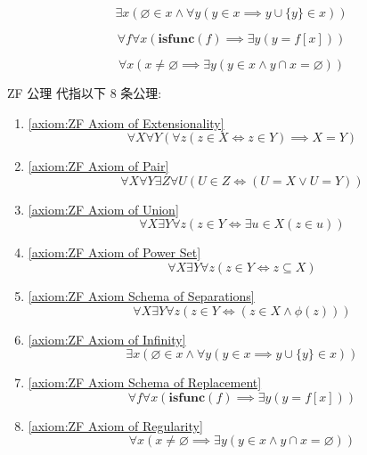 \begin{axiom}
    \label {axiom:ZF Axiom of Infinity}
    \[
        \exists x (\varnothing \in x \land \forall y (y \in x \implies y \cup \{y\} \in x))
    \]
\end{axiom}

\begin{axiom}
    \label {axiom:ZF Axiom Schema of Replacement}
    \[
        \forall f \forall x (\mathbf{isfunc} (f) \implies \exists y (y = f[x]))
    \]
\end{axiom}

\begin{axiom}
    \label {axiom:ZF Axiom of Regularity}
    \[
        \forall x (x \neq \varnothing \implies \exists y (y \in x \land y \cap x = \varnothing))
    \]
\end{axiom}

ZF 公理 \cite{ThomasJech:SetTheory} 代指以下 8 条公理:

\begin{enumerate}
    \item \ref{axiom:ZF Axiom of Extensionality}
    \[
        \forall X \forall Y (\forall z (z \in X \iff z \in Y) \implies X = Y)
    \]
    \item \ref{axiom:ZF Axiom of Pair}
    \[
        \forall X \forall Y \exists Z \forall U (U \in Z \iff (U = X \lor U = Y))
    \]
    \item \ref{axiom:ZF Axiom of Union}
    \[
        \forall X \exists Y \forall z (z \in Y \iff \exists u \in X (z \in u))
    \]
    \item \ref{axiom:ZF Axiom of Power Set}
    \[
        \forall X \exists Y \forall z (z \in Y \iff z \subseteq X)
    \]
    \item \ref{axiom:ZF Axiom Schema of Separations}
    \[
        \forall X \exists Y \forall z (z \in Y \iff (z \in X \land \phi (z)))
    \]
    \item \ref{axiom:ZF Axiom of Infinity}
    \[
        \exists x (\varnothing \in x \land \forall y (y \in x \implies y \cup \{y\} \in x))
    \]
    \item \ref{axiom:ZF Axiom Schema of Replacement}
    \[
        \forall f \forall x (\mathbf{isfunc} (f) \implies \exists y (y = f[x]))
    \]
    \item \ref{axiom:ZF Axiom of Regularity}
    \[
        \forall x (x \neq \varnothing \implies \exists y (y \in x \land y \cap x = \varnothing))
    \]
\end{enumerate}

